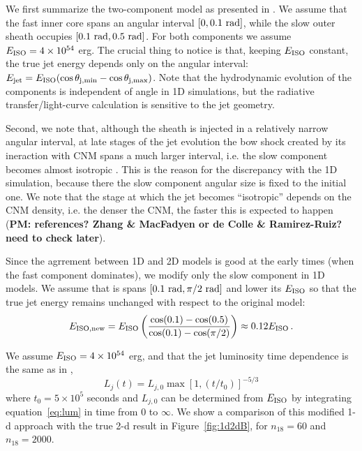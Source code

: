 \documentclass[usenatbib,fleqn]{mnras}
\begin{document}
We first summarize the two-component model as presented in \citet{Mimica+2015}. We assume that the fast inner core spans an angular interval $[0, 0.1\ {\rm rad}]$, while the slow outer sheath occupies $[0.1\ {\rm rad}, 0.5\ {\rm rad}]$. For both components we assume $E_{\rm ISO} = 4\times 10^{54}$ erg. The crucial thing to notice is that, keeping $E_{\rm ISO}$ constant, the true jet energy depends only on the angular interval: $E_{\rm jet} = E_{\rm ISO} (\cos\theta_{\rm j,min} - \cos\theta_{\rm j,max})$. Note that the hydrodynamic evolution of the components is independent of angle in 1D simulations, but the radiative transfer/light-curve calculation is sensitive to the jet geometry.

Second, we note that, although the sheath is injected in a relatively narrow angular interval, at late stages of the jet evolution the bow shock created by its ineraction with CNM spans a much larger interval, i.e. the slow component becomes almost isotropic \citep[bottom two panels in Fig. 8 in][]{Mimica+2015}. This is the reason for the discrepancy with the 1D simulation, because there the slow component angular size is fixed to the initial one. We note that the stage at which the jet becomes ``isotropic'' depends on the CNM density, i.e. the denser the CNM, the faster this is expected to happen ({\bf PM: references? Zhang \& MacFadyen or de Colle \& Ramirez-Ruiz? need to check later}).

Since the agrrement between 1D and 2D models is good at the early times (when the fast component dominates), we modify only the slow component in 1D models. We assume that is spans $[0.1\ {\rm rad}, \pi/2\ {\rm rad}]$ and lower its $E_{\rm ISO}$ so that the true jet energy remains unchanged with respect to the original model:
\begin{equation}\label{eq:Eiso}
 E_{\rm ISO, new} = E_{\rm ISO} \left(\frac{\cos(0.1) - \cos(0.5)}{\cos(0.1) - \cos(\pi/2)}\right)\approx 0.12 E_{\rm ISO}\, .
\end{equation}

We assume $E_{\rm ISO} = 4\times 10^{54}$ erg, and that the jet luminosity time dependence is the same as in \citet{Mimica+2015},
\begin{equation}\label{eq:lum}
L_j(t) = L_{j,0}\max\left[1, (t/t_0)\right]^{-5/3}
\end{equation}
where $t_0 = 5\times 10^5$ seconds and $L_{j, 0}$ can be determined from $E_{\rm ISO}$ by integrating equation~\ref{eq:lum} in time from $0$ to $\infty$. We show a comparison of this modified 1-d approach with the true 2-d result in Figure~\ref{fig:1d2dB}, for $n_{18}=60$ and $n_{18}=2000$.
\end{document}
